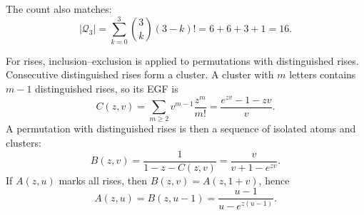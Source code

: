 The count also matches:
\begin{equation*}
    |\mathcal{Q}_3|
        = \sum_{k=0}^{3}\binom{3}{k}(3-k)!
        = 6+6+3+1
        = 16.
\end{equation*}



For rises, inclusion--exclusion is applied to permutations with distinguished rises. Consecutive
distinguished rises form a cluster. A cluster with $m$ letters contains $m-1$ distinguished
rises, so its EGF is
\begin{equation*}
    C(z,v)=\sum_{m\geq 2}v^{m-1}\frac{z^m}{m!}
        = \frac{e^{zv}-1-zv}{v}.
\end{equation*}
A permutation with distinguished rises is then a sequence of isolated atoms and clusters:
\begin{equation*}
    B(z,v)=\frac{1}{1-z-C(z,v)}
        = \frac{v}{v+1-e^{zv}}.
\end{equation*}
If $A(z,u)$ marks all rises, then $B(z,v)=A(z,1+v)$, hence
\begin{equation*}
    A(z,u)=B(z,u-1)=\frac{u-1}{u-e^{z(u-1)}}.
\end{equation*}

